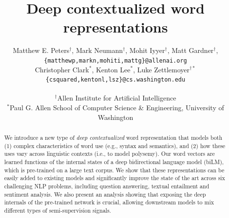 \documentclass[11pt,a4paper]{article}
\title{Deep contextualized word representations}
\author{Matthew E. Peters$^\dagger$, Mark Neumann$^\dagger$, Mohit Iyyer$^\dagger$, Matt Gardner$^\dagger$, \\
\texttt{\{matthewp,markn,mohiti,mattg\}@allenai.org} \\
\AND
Christopher Clark$^*$, Kenton Lee$^*$, Luke Zettlemoyer$^{\dagger*}$ \\
\texttt{\{csquared,kentonl,lsz\}@cs.washington.edu} \\
\\ $^\dagger$Allen Institute for Artificial Intelligence \\
$^*$Paul G. Allen School of Computer Science \& Engineering, University of Washington
}
\newcommand{\ELMO}{ELMo}
\begin{document}
\maketitle

\begin{abstract}
We introduce a new type of {\em deep contextualized} word representation that models both (1) complex characteristics of word use (e.g., syntax and semantics), and (2) how these uses vary across linguistic
contexts (i.e., to model polysemy).
Our word vectors are learned functions of the internal states of a deep bidirectional language model (biLM), which is pre-trained on a large text corpus.
We show that these representations can be easily added to existing models and significantly improve the state of the art across six challenging NLP problems, including question answering, textual entailment and sentiment analysis.
We also present an analysis showing that exposing the deep internals of the pre-trained network is crucial, allowing downstream models to mix different types of semi-supervision signals.




\end{abstract}
\end{document}
